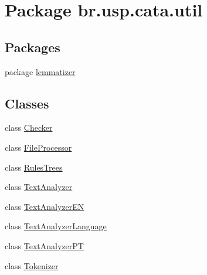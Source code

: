 \hypertarget{namespacebr_1_1usp_1_1cata_1_1util}{\section{Package br.\+usp.\+cata.\+util}
\label{namespacebr_1_1usp_1_1cata_1_1util}
}
\subsection*{Packages}
\begin{DoxyCompactItemize}
\item 
package \hyperlink{namespacebr_1_1usp_1_1cata_1_1util_1_1lemmatizer}{lemmatizer}
\end{DoxyCompactItemize}
\subsection*{Classes}
\begin{DoxyCompactItemize}
\item 
class \hyperlink{classbr_1_1usp_1_1cata_1_1util_1_1_checker}{Checker}
\item 
class \hyperlink{classbr_1_1usp_1_1cata_1_1util_1_1_file_processor}{File\+Processor}
\item 
class \hyperlink{classbr_1_1usp_1_1cata_1_1util_1_1_rules_trees}{Rules\+Trees}
\item 
class \hyperlink{classbr_1_1usp_1_1cata_1_1util_1_1_text_analyzer}{Text\+Analyzer}
\item 
class \hyperlink{classbr_1_1usp_1_1cata_1_1util_1_1_text_analyzer_e_n}{Text\+Analyzer\+E\+N}
\item 
class \hyperlink{classbr_1_1usp_1_1cata_1_1util_1_1_text_analyzer_language}{Text\+Analyzer\+Language}
\item 
class \hyperlink{classbr_1_1usp_1_1cata_1_1util_1_1_text_analyzer_p_t}{Text\+Analyzer\+P\+T}
\item 
class \hyperlink{classbr_1_1usp_1_1cata_1_1util_1_1_tokenizer}{Tokenizer}
\end{DoxyCompactItemize}
